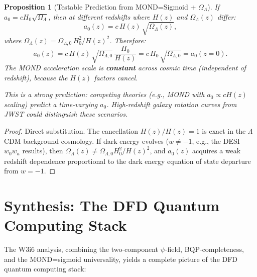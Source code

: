 \documentclass[11pt]{article}
\newtheorem{proposition}[theorem]{Proposition}
\theoremstyle{definition}
\theoremstyle{remark}
\begin{document}
\begin{proposition}[Testable Prediction from MOND=Sigmoid + $\Omega_\Lambda$]
\label{prop:sigmoid-test}
If $a_0 = cH_0\sqrt{\Omega_\Lambda}$, then at different redshifts
where $H(z)$ and $\Omega_\Lambda(z)$ differ:
\begin{equation}
  a_0(z) = c\,H(z)\,\sqrt{\Omega_\Lambda(z)},
\end{equation}
where $\Omega_\Lambda(z) = \Omega_{\Lambda,0}\,H_0^2/H(z)^2$.
Therefore:
\begin{equation}
  a_0(z) = c\,H(z)\,\sqrt{\Omega_{\Lambda,0}}\,\frac{H_0}{H(z)}
  = c\,H_0\,\sqrt{\Omega_{\Lambda,0}} = a_0(z=0).
  \label{eq:a0-constant}
\end{equation}
The MOND acceleration scale is \textbf{constant} across cosmic time
(independent of redshift), because the $H(z)$ factors cancel.

This is a strong prediction: competing theories (e.g., MOND with
$a_0 \propto cH(z)$ scaling) predict a time-varying $a_0$.  High-redshift
galaxy rotation curves from JWST could distinguish these scenarios.
\end{proposition}

\begin{proof}
Direct substitution.  The cancellation $H(z)/H(z) = 1$ is exact in
the $\Lambda$CDM background cosmology.  If dark energy evolves
($w \neq -1$, e.g., the DESI $w_0w_a$ results), then
$\Omega_\Lambda(z) \neq \Omega_{\Lambda,0}H_0^2/H(z)^2$, and
$a_0(z)$ acquires a weak redshift dependence proportional to the
dark energy equation of state departure from $w = -1$.
\end{proof}

\section{Synthesis: The DFD Quantum Computing Stack}
\label{sec:synthesis}

The W3i6 analysis, combining the two-component $\psi$-field, BQP-completeness,
and the MOND=sigmoid universality, yields a complete picture of the
DFD quantum computing stack:
\end{document}
